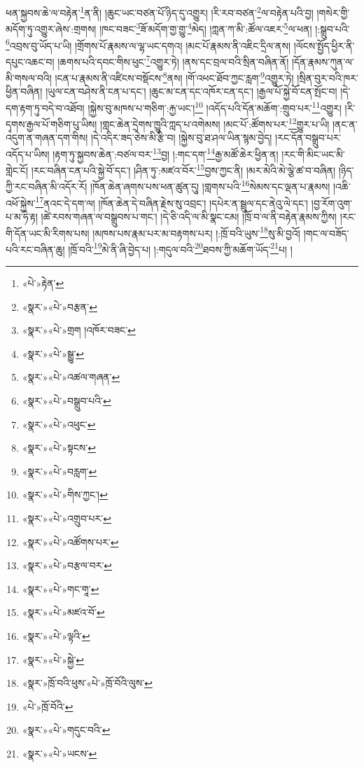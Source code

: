 ཕན་སྐྱབས་ཆེ་ལ་བརྟེན་\footnote{«པེ་»རྟེན་}ན་ནི། །ཆུང་ཡང་བཙན་པོ་ཉིད་དུ་འགྱུར། །རི་རབ་བཙན་\footnote{«སྣར་»«པེ་»བརྩན་}ལ་བརྟེན་པའི་བྱ། །གསེར་གྱི་མདོག་ཏུ་འགྱུར་ཞེས་:གྲགས། །ཁང་བཟང་\footnote{«སྣར་»«པེ་»གྲག །འཁོར་བཟང་}ཟོ་མདོག་གྱ་གྱུ་\footnote{«སྣར་»«པེ་»སྒྱུ་}མེད། །ཀླན་ཀ་མི་:ཚོལ་འཇར་\footnote{«སྣར་»«པེ་»འཚལ་གཞན་}ལ་ཕན། །:སྒྲུབ་པའི་\footnote{«སྣར་»«པེ་»བསྒྲུབ་པའི་}འབྲས་བུ་ཡོད་པ་ཡི། །གྲོགས་པོ་རྣམས་ལ་ལྷ་ཡང་དགའ། །མང་པོ་རྣམས་ནི་འཇིང་དྲིལ་ནས། །ལོངས་སྤྱོད་ཕྱིར་ནི་དཔུང་འཆང་བ། །ཆགས་པའི་དབང་གིས་ཕུང་\footnote{«སྣར་»«པེ་»འཕུང་}འགྱུར་ཏེ། །ནས་དང་བྲལ་བའི་སྲིན་བཞིན་ནོ། །དོན་རྣམས་ཀུན་ལ་མི་གསལ་བའི། །ངན་པ་རྣམས་ནི་འཛིངས་བསྡོངས་\footnote{«སྣར་»«པེ་»སྟངས་}ནས། །གོ་འཕང་ཐོབ་ཀྱང་རླག་\footnote{«སྣར་»«པེ་»བརླག་}འགྱུར་ཏེ། །སྲིན་བུར་བའི་ཁར་ཕྱིན་བཞིན། །ཡུལ་ངན་བཤེས་ནི་ངན་པ་དང་། །ཆུང་མ་ངན་དང་འཁོར་ངན་དང་། །རྒྱལ་པོ་སྐྱེ་བོ་ངན་སྤོང་བ། །དེ་དག་རྟག་ཏུ་བདེ་བ་འཐོབ། །སྐྱེས་བུ་མཁས་པ་གཅིག་:རྐྱ་ཡང་།\footnote{«སྣར་»«པེ་»གིས་ཀྱང་།} །འདོད་པའི་དོན་མཆོག་:གྲུབ་པར་\footnote{«སྣར་»«པེ་»འགྲུབ་པར་}འགྱུར། །རི་དྭགས་རྒྱལ་པོ་གཅིག་པུ་ཡིས། །གླང་ཆེན་དྲེགས་ཁྱུའི་ཀླད་པ་འགེམས། །མང་པོ་:ཚོགས་པར་\footnote{«སྣར་»«པེ་»འཚོགས་པར་}གྱུར་པ་ཡི། །ནང་ན་འདུག་ན་གཞན་དག་གིས། །དེ་འདིར་ཟད་ཅེས་མི་རྩི་བ། །སྐྱེས་བུ་ཐ་ཤལ་ཡིན་སྙམ་བྱེད། །རང་དོན་བསྒྲུབ་པར་འདོད་པ་ཡིས། །རྟག་ཏུ་སྐྱབས་ཆེན་:བཙལ་བར་\footnote{«སྣར་»«པེ་»བརྩལ་བར་}བྱ། །:གང་དག་\footnote{«སྣར་»«པེ་»གང་གཱ་}རྒྱ་མཚོ་ཆེར་ཕྱིན་ན། །རང་གི་མིང་ཡང་མི་གླེང་ངོ། །རང་བཞིན་ངན་པའི་སྐྱེ་བོ་དང་། །ཤིན་ཏུ་:མཛའ་བོར་\footnote{«སྣར་»«པེ་»མཛའ་བོ་}བྱས་ཀྱང་ནི། །མར་མེའི་མེ་ལྕེ་ཚ་བ་བཞིན། །ཉིད་ཀྱི་རང་བཞིན་མི་འདོར་རོ། །ཁོན་ཆེན་ཞགས་པས་ཕན་ཚུན་དུ། །གླགས་པའི་\footnote{«སྣར་»«པེ་»ལྟའི་}སེམས་དང་ལྡན་པ་རྣམས། །འཆི་འཕོ་སྐྱེས་\footnote{«སྣར་»«པེ་»སྐྱེ་}ནའང་དེ་དག་ལ། །ཁོན་ཆེན་དེ་བཞིན་རྗེས་སུ་འབྲང་། །དཔེར་ན་སྦྲུལ་དང་ནེའུ་ལེ་དང་། །བྱ་རོག་འུག་པ་མ་ཧེ་རྟ། །ཚེ་རབས་གཞན་ལ་བསྒྲུབས་པ་གང་། །དེ་ཅི་འདི་ལ་མི་སྣང་ངམ། །ཁྲོ་བ་ལ་ནི་བརྟེན་རྣམས་ཀྱིས། །རང་གི་དོན་ཡང་མི་རིགས་པས། །མཁས་པས་རྣམ་པར་མ་བརྟགས་པར། །:ཁྲོ་བའི་ཡུས་\footnote{«སྣར་»ཁྲོ་བའི་ཕུས་«པེ་»ཁྲོ་བོའི་ལུས་}སུ་མི་བྱའོ། །གང་ལ་བཟོད་པའི་རང་བཞིན་ཆུ། །ཁྲོ་བའི་\footnote{«པེ་»ཁྲོ་བོའི་}མེ་ནི་ཞི་བྱེད་པ། །:གདུལ་བའི་\footnote{«སྣར་»«པེ་»གདུང་བའི་}ཐབས་ཀྱི་མཆོག་ཡོད་\footnote{«སྣར་»«པེ་»ཡངས་}པ། །
